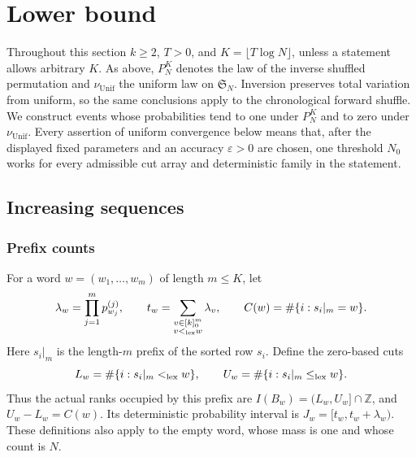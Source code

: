 \documentclass[11pt]{article}
\numberwithin{equation}{section}
\theoremstyle{definition}
\theoremstyle{remark}
\newcommand{\Unif}{\mathrm{Unif}}
\newcommand{\nuUnif}{\nu_{\Unif}}
\newcommand{\1}{\mathbf 1}
\begin{document}
\section{Lower bound}\label{sec:lower-bound}\label{sec:lower}
Throughout this section $k\ge2$, $T>0$, and $K=\lfloor T\log N\rfloor$, unless a statement allows arbitrary $K$. As above, $P_N^K$ denotes the law of the inverse shuffled permutation and $\nuUnif$ the uniform law on $\mathfrak S_N$. Inversion preserves total variation from uniform, so the same conclusions apply to the chronological forward shuffle. We construct events whose probabilities tend to one under $P_N^K$ and to zero under $\nuUnif$. Every assertion of uniform convergence below means that, after the displayed fixed parameters and an accuracy $\varepsilon>0$ are chosen, one threshold $N_0$ works for every admissible cut array and deterministic family in the statement.
\subsection{Increasing sequences}\subsubsection{Prefix counts}

For a word \(w=(w_1,\ldots,w_m)\) of length \(m\le K\), let
\[
 \lambda_w=\prod_{j=1}^m p^{(j)}_{w_j},\qquad
 t_w=\sum_{\substack{v\in[k]_0^m\\v<_{\rm lex}w}}\lambda_v,
 \qquad C(w)=\#\{i:s_i|_m=w\}.
\]
Here \(s_i|_m\) is the length-\(m\) prefix of the sorted row \(s_i\).
Define the zero-based cuts
\[
 L_w=\#\{i:s_i|_m<_{\rm lex}w\},\qquad
 U_w=\#\{i:s_i|_m\le_{\rm lex}w\}.
\]
Thus the actual ranks occupied by this prefix are
\(I(B_w)=(L_w,U_w]\cap\mathbb Z\), and \(U_w-L_w=C(w)\).
Its deterministic probability interval is
\(J_w=[t_w,t_w+\lambda_w)\). These definitions also apply to the empty
word, whose mass is one and whose count is \(N\).
\end{document}

